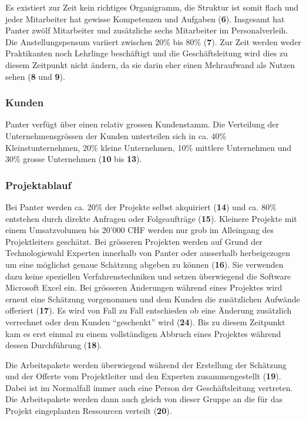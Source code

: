 Es existiert zur Zeit kein richtiges Organigramm, die Struktur ist somit flach
und jeder Mitarbeiter hat gewisse Kompetenzen und Aufgaben (\textbf{6}). 
Insgesamt hat Panter zwölf Mitarbeiter und zusätzliche sechs Mitarbeiter im
Personalverleih. Die Anstellungspensum variiert zwischen 20\% bis 80\% (\textbf{7}).
Zur Zeit werden weder Praktikanten noch Lehrlinge beschäftigt und die Geschäftsleitung
wird dies zu diesem Zeitpunkt nicht ändern, da sie darin eher einen Mehraufwand
als Nutzen sehen (\textbf{8} und \textbf{9}).

\subsubsection{Kunden}
Panter verfügt über einen relativ grossen Kundenstamm. Die Verteilung
der Unternehmensgrössen der Kunden unterteilen sich in ca. 40\% Kleinstunternehmen,
20\% kleine Unternehmen, 10\% mittlere Unternehmen und 30\% grosse
Unternehmen (\textbf{10} bis \textbf{13}).

\subsubsection{Projektablauf}
Bei Panter werden ca. 20\% der Projekte selbst akquiriert (\textbf{14}) und ca.
80\% entstehen durch direkte Anfragen oder Folgeaufträge (\textbf{15}). Kleinere
Projekte mit einem Umsatzvolumen bis 20'000 CHF werden nur grob im Alleingang
des Projektleiters geschätzt. Bei grösseren Projekten werden auf Grund der
Technologiewahl Experten innerhalb von Panter oder ausserhalb herbeigezogen
um eine möglichst genaue Schätzung abgeben zu können (\textbf{16}). Sie verwenden
dazu keine speziellen Verfahrenstechniken und setzen überwiegend die Software
Microsoft Excel ein. Bei grösseren Änderungen während eines Projektes wird
erneut eine Schätzung vorgenommen und dem Kunden die zusätzlichen Aufwände
offeriert (\textbf{17}). Es wird von Fall zu Fall entschieden ob eine Änderung 
zusätzlich verrechnet oder dem Kunden ``geschenkt'' wird (\textbf{24}). Bis zu 
diesem Zeitpunkt kam es erst einmal zu einem vollständigen Abbruch eines Projektes 
während dessen Durchführung (\textbf{18}).

Die Arbeitspakete werden überwiegend während der Erstellung der Schätzung und 
der Offerte vom Projektleiter und den Experten zusammengestellt (\textbf{19}).
Dabei ist im Normalfall immer auch eine Person der Geschäftsleitung vertreten.
Die Arbeitspakete werden dann auch gleich von dieser Gruppe an die für das 
Projekt eingeplanten Ressourcen verteilt (\textbf{20}).

